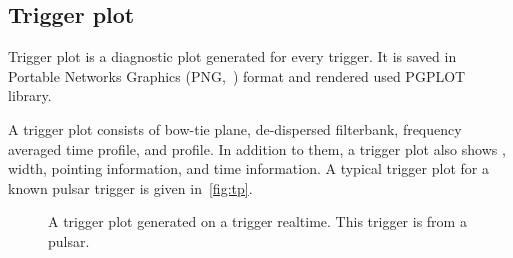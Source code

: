 \subsection {Trigger plot}
\label{ssub:tp}
\par Trigger plot is a diagnostic plot generated for every trigger. 
It is saved in Portable Networks Graphics (PNG,~\cite{png}) format and rendered used PGPLOT~\cite{pgplot} library.

\par A trigger plot consists of bow-tie plane, de-dispersed filterbank, frequency averaged time profile, and \dm profile. 
In addition to them, a trigger plot also shows \sn, width, pointing information, and time information.
A typical trigger plot for a known pulsar trigger is given in~\autoref{fig:tp}.

\begin{figure}
	\label{fig:tp}
	\caption{A trigger plot generated on a trigger realtime. This trigger is from a pulsar.}
\end{figure}

